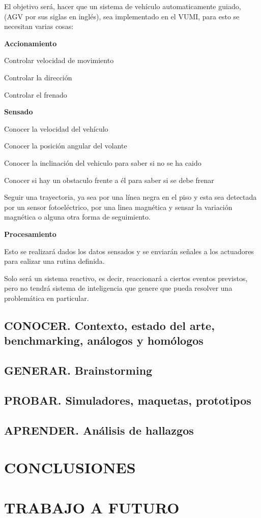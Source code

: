 \documentclass[12pt,letterpaper]{book}
\begin{document}
El objetivo será, hacer que un sistema de vehículo automaticamente guiado, (AGV por sus siglas en inglés), sea implementado en el VUMI, para esto se necesitan varias cosas:

\textbf{Accionamiento}

Controlar velocidad de movimiento

Controlar la dirección

Controlar el frenado

\textbf{Sensado}

Conocer la velocidad del vehículo

Conocer la posición angular del volante

Conocer la inclinación del vehiculo para saber si no se ha caido

Conocer si hay un obstaculo frente a él para saber si se debe frenar

Seguir una trayectoria, ya sea por una línea negra en el piso y esta sea detectada por un sensor fotoeléctrico, por una linea magnética y sensar la variación magnética o alguna otra forma de seguimiento.

\textbf{Procesamiento}

Esto se realizará dados los datos sensados y se enviarán señales a los actuadores para ealizar una rutina definida.

Solo será un sistema reactivo, es decir, reaccionará a ciertos eventos previstos, pero no tendrá sistema de inteligencia que genere que pueda resolver una problemática en particular.




\section{CONOCER. Contexto, estado del arte, benchmarking, análogos y homólogos}

\section{GENERAR. Brainstorming}

\section{PROBAR. Simuladores, maquetas, prototipos}

\section{APRENDER. Análisis de hallazgos}

\newpage

\chapter*{CONCLUSIONES}

\chapter*{TRABAJO A FUTURO}
\end{document}
